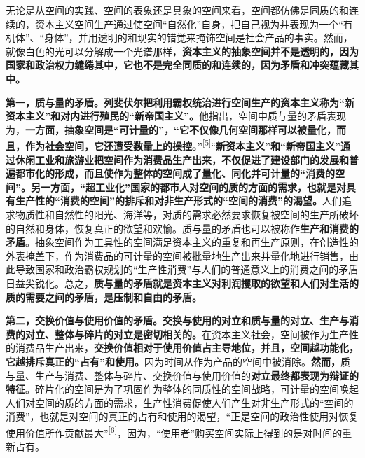 \documentclass[UTF8, fontset = sourcesans, a4paper, oneside, zihao =
-4, scheme=chinese, no-math, space=true]{ctexbook}
\begin{document}
无论是从空间的实践、空间的表象还是具象的空间来看，空间都仿佛是同质的和连续的，资本主义空间生产通过使空间``自然化''自身，把自己视为并表现为一个``有机体''、``身体''，并用透明的和现实的错觉来掩饰空间是社会产品的事实。然而，就像白色的光可以分解成一个光谱那样，\textbf{资本主义的抽象空间并不是透明的，因为国家和政治权力缱绻其中，它也不是完全同质的和连续的，因为矛盾和冲突蕴藏其中。}

\textbf{第一，质与量的矛盾。列斐伏尔把利用霸权统治进行空间生产的资本主义称为``新资本主义''和对内进行殖民的``新帝国主义''。}他指出，空间中质与量的矛盾表现为，\textbf{一方面，抽象空间是``可计量的''，``它不仅像几何空间那样可以被量化，而且，作为社会空间，它还遭受数量上的操控。''}\protect\hypertarget{part0008_split_001.htmlux5cux23w5}{}{}\protect\hyperlink{part0008_split_003.htmlux5cux23m5}{\textsuperscript{{[}5{]}}}``\textbf{新资本主义''和``新帝国主义''通过休闲工业和旅游业把空间作为消费品生产出来，不仅促进了建设部门的发展和普遍都市化的形成，而且使作为整体的空间成了量化、同化并可计量的``消费的空间''。另一方面，``超工业化''国家的都市人对空间的质的方面的需求，也就是对具有生产性的``消费的空间''的排斥和对非生产形式的``空间的消费''的渴望。}人们追求物质性和自然性的阳光、海洋等，对质的需求必然要求恢复被空间的生产所破坏的自然和身体，恢复真正的欲望和欢愉。质与量的矛盾也可以被称作\textbf{生产和消费的矛盾}。抽象空间作为工具性的空间满足资本主义的重复和再生产原则，在创造性的外表掩盖下，作为消费品的可计量的空间被批量地生产出来并量化地进行销售，由此导致国家和政治霸权规划的``生产性消费''与人们的普通意义上的消费之间的矛盾日益尖锐化。总之，\textbf{质与量的矛盾就是资本主义对利润攫取的欲望和人们对生活的质的需要之间的矛盾，是压制和自由的矛盾。}

\textbf{第二，交换价值与使用价值的矛盾。交换与使用的对立和质与量的对立、生产与消费的对立、整体与碎片的对立是密切相关的。}在资本主义社会，空间被作为生产性的消费品生产出来，\textbf{交换价值相对于使用价值占主导地位，并且，空间越功能化，它越排斥真正的``占有''和使用。}因为时间从作为产品的空间中被消除。\textbf{然而，}质与量、生产与消费、整体与碎片、交换价值与使用价值的\textbf{对立最终都表现为辩证的特征}。碎片化的空间是为了巩固作为整体的同质性的空间战略，可计量的空间唤起人们对空间的质的方面的需求，生产性消费促使人们产生对非生产形式的``空间的消费''，也就是对空间的真正的占有和使用的渴望，``正是空间的政治性使用对恢复使用价值所作贡献最大''\protect\hypertarget{part0008_split_001.htmlux5cux23w6}{}{}\protect\hyperlink{part0008_split_003.htmlux5cux23m6}{\textsuperscript{{[}6{]}}}，因为，``使用者''购买空间实际上得到的是对时间的重新占有。
\end{document}
